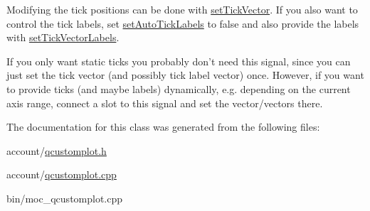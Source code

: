 \-Modifying the tick positions can be done with \hyperlink{classQCPAxis_a871db94c5d796c80fcbe1a9d4506e27e}{set\-Tick\-Vector}. \-If you also want to control the tick labels, set \hyperlink{classQCPAxis_aaa47e3a6bac0c20d4beb9028f01bc1a1}{set\-Auto\-Tick\-Labels} to false and also provide the labels with \hyperlink{classQCPAxis_a921d3ba3853ca3bd2cce3459f7a243ed}{set\-Tick\-Vector\-Labels}.

\-If you only want static ticks you probably don't need this signal, since you can just set the tick vector (and possibly tick label vector) once. \-However, if you want to provide ticks (and maybe labels) dynamically, e.\-g. depending on the current axis range, connect a slot to this signal and set the vector/vectors there. 

\-The documentation for this class was generated from the following files\-:\begin{DoxyCompactItemize}
\item 
account/\hyperlink{qcustomplot_8h}{qcustomplot.\-h}\item 
account/\hyperlink{qcustomplot_8cpp}{qcustomplot.\-cpp}\item 
bin/moc\-\_\-qcustomplot.\-cpp\end{DoxyCompactItemize}
